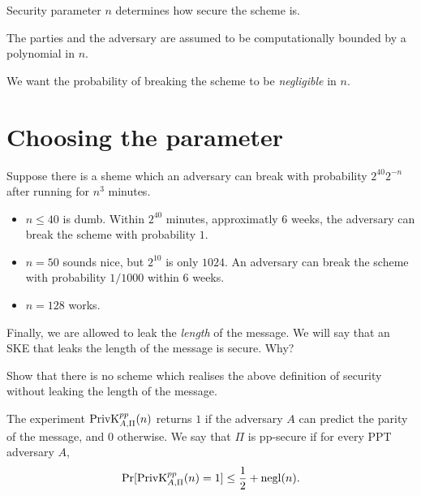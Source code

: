
Security parameter $n$ determines how secure the scheme is.

The parties and the adversary are assumed to be computationally bounded by
a polynomial in $n$.

We want the probability of breaking the scheme to be \emph{negligible} in
$n$.

\section{Choosing the parameter} \label{sec:choosing-n}
Suppose there is a sheme which an adversary can break with probability
$2^{40} 2^{-n}$ after running for $n^3$ minutes.
\begin{itemize}
    \item $n \le 40$ is dumb.
    Within $2^{40}$ minutes, approximatly $6$ weeks, the adversary can break
    the scheme with probability $1$.
    \item $n = 50$ sounds nice, but $2^{10}$ is only $1024$.
    An adversary can break the scheme with probability $1/1000$ within
    $6$ weeks.
    \item $n = 128$ works. %
\end{itemize}

Finally, we are allowed to leak the \emph{length} of the message.
We will say that an SKE that leaks the length of the message is
secure.
Why?
\begin{exercise}
    Show that there is no scheme which realises the above definition of
    security without leaking the length of the message.
\end{exercise}

\begin{definition} \label{def:pp-secure}
    The experiment $\operatorname{PrivK}^{pp}_{A, \Pi}(n)$ returns $1$ if the adversary
    $A$ can predict the parity of the
    message, and $0$ otherwise.
    We say that $\Pi$ is pp-secure if for every PPT adversary $A$,
    \[
        \Pr[\operatorname{PrivK}^{pp}_{A, \Pi}(n) = 1] \le \frac{1}{2} + \operatorname{negl}(n).
    \]
\end{definition}

